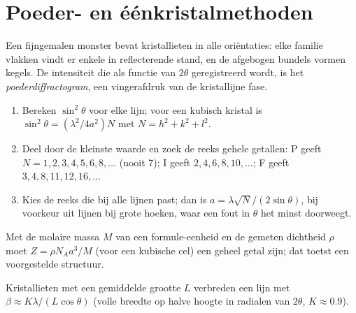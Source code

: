 \section{Poeder- en éénkristalmethoden}

\begin{definition}[Poederdiffractogram]\label{def:b3:x-ray-diffraction:powder}
Een fijngemalen monster bevat kristallieten in alle oriëntaties: elke
familie vlakken vindt er enkele in reflecterende stand, en de afgebogen
bundels vormen kegels. De intensiteit die als functie van $2\theta$
geregistreerd wordt, is het
\emph{poederdiffractogram}, een vingerafdruk
van de kristallijne fase.
\end{definition}

\begin{method}\label{met:b3:x-ray-diffraction:index-cubic}
\begin{enumerate}
  \item Bereken $\sin^2\theta$ voor elke lijn; voor een kubisch kristal is $\sin^2\theta =
        (\lambda^2/4a^2)N$ met $N = h^2 + k^2 + l^2$.
  \item Deel door de kleinste waarde en zoek de reeks gehele getallen: P geeft
        $N = 1, 2, 3, 4, 5, 6, 8, \dots$ (nooit 7); I geeft $2, 4, 6, 8, 10, \dots$; F geeft
        $3, 4, 8, 11, 12, 16, \dots$
  \item Kies de reeks die bij alle lijnen past; dan is $a = \lambda\sqrt N/(2\sin\theta)$, bij
        voorkeur uit lijnen bij grote hoeken, waar een fout in $\theta$ het
        minst doorweegt.
\end{enumerate}
\end{method}

\begin{method}\label{met:b3:x-ray-diffraction:z-from-density}
Met de molaire massa $M$ van een formule-eenheid en de gemeten dichtheid $\rho$ moet $Z =
\rho N_Aa^3/M$ (voor een kubische cel) een geheel getal zijn; dat toetst
een voorgestelde structuur.
\end{method}

\begin{proposition}\label{prop:b3:x-ray-diffraction:scherrer}
Kristallieten met een gemiddelde grootte $L$ verbreden een lijn met $\beta \approx K\lambda/(L\cos\theta)$ (volle
breedte op halve hoogte in radialen van $2\theta$, $K \approx 0.9$).
\end{proposition}
\admitted

